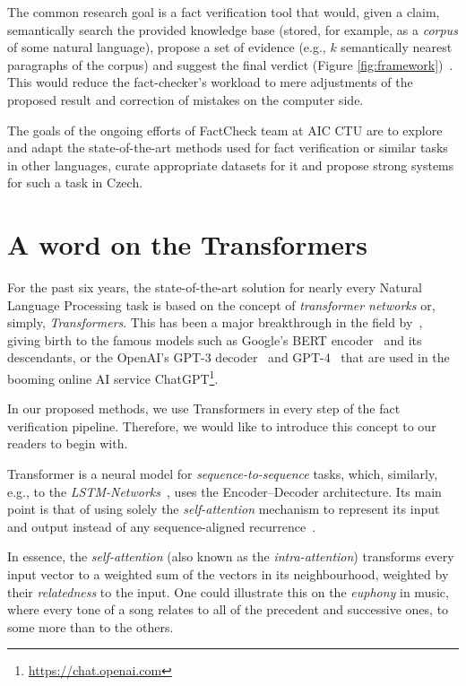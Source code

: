 The common research goal is a fact verification tool that would, given a claim, semantically search the provided knowledge base (stored, for example, as a \textit{corpus} of some natural language), propose a set of evidence (e.g., $k$ semantically nearest paragraphs of the corpus) and suggest the final verdict (Figure \ref{fig:framework})~\cite{guo-etal-2022-survey}. This would reduce the fact-checker's workload to mere adjustments of the proposed result and correction of mistakes on the computer side. 

The goals of the ongoing efforts of {\textsf{FactCheck}} team at {\textsf{AIC CTU}} are to explore and adapt the state-of-the-art methods used for fact verification or similar tasks in other languages, curate appropriate datasets for it and propose strong systems for such a task in Czech.


\section{A word on the Transformers}
\label{sec:transformers}
For the past six years, the state-of-the-art solution for nearly every Natural Language Processing task is based on the concept of \textit{transformer networks} or, simply, \textit{Transformers}. This has been a major breakthrough in the field by~\cite{vaswani}, giving birth to the famous models such as \textsf{Google}'s \textsf{BERT} encoder~\cite{devlin2019bert} and its descendants, or the \textsf{OpenAI}'s \textsf{GPT-3} decoder~\cite{gpt3} and \textsf{GPT-4}~\cite{gpt4} that are used in the booming online AI service \textsf{ChatGPT}\footnote{\url{https://chat.openai.com}}.

In our proposed methods, we use Transformers in every step of the fact verification pipeline. Therefore, we would like to introduce this concept to our readers to begin with. 

Transformer is a neural model for \textit{sequence-to-sequence} tasks, which, similarly, e.g., to the \textit{LSTM-Networks}~\cite{lstm}, uses the Encoder--Decoder architecture. Its main point is that of using solely the \textit{self-attention} mechanism to represent its input and output instead of any sequence-aligned recurrence~\cite{vaswani}.

In essence, the \textit{self-attention} (also known as the \textit{intra-attention}) transforms every input vector to a weighted sum of the vectors in its neighbourhood, weighted by their \textit{relatedness} to the input. One could illustrate this on the \textit{euphony} in music, where every tone of a song relates to all of the precedent and successive ones, to some more than to the others.

